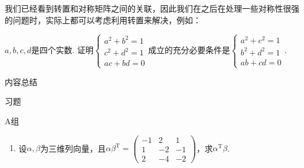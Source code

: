 \begin{solution}

\end{solution}

我们已经看到转置和对称矩阵之间的关联，因此我们在之后在处理一些对称性很强的问题时，实际上都可以考虑利用转置来解决，例如：
\begin{example}
    $a,b,c,d$是四个实数. 证明$\begin{cases}
            a^2+b^2=1 \\
            c^2+d^2=1 \\
            ac+bd=0
        \end{cases}$成立的充分必要条件是$\begin{cases}
            a^2+c^2=1 \\
            b^2+d^2=1 \\
            ab+cd=0
        \end{cases}$.
\end{example}

\begin{solution}

\end{solution}

\vspace{2ex}
\centerline{\heiti \Large 内容总结}

\vspace{2ex}
\centerline{\heiti \Large 习题}

\vspace{2ex}
{\kaishu }
\begin{flushright}
    \kaishu

\end{flushright}

\centerline{\heiti A组}
\begin{enumerate}
    \item 设$\alpha,\beta$为三维列向量，且$\alpha\beta^\mathrm{T}=\begin{pmatrix}
                  -1 & 2  & 1  \\
                  1  & -2 & -1 \\
                  2  & -4 & -2
              \end{pmatrix}$，求$\alpha^\mathrm{T}\beta$.
\end{enumerate}

